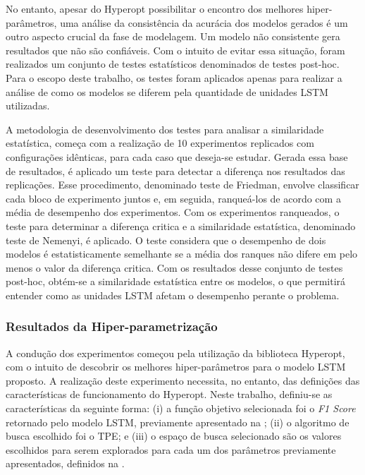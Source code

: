 No entanto, apesar do Hyperopt possibilitar o encontro dos melhores hiper-parâmetros, uma análise da consistência da acurácia dos modelos gerados é um outro aspecto crucial da fase de modelagem. Um modelo não consistente gera resultados que não são confiáveis. Com o intuito de evitar essa situação, foram realizados um conjunto de testes estatísticos denominados de testes post-hoc. Para o escopo deste trabalho, os testes foram aplicados apenas para realizar a análise de como os modelos se diferem pela quantidade de unidades \acrshort{LSTM} utilizadas.

A metodologia de desenvolvimento dos testes para analisar a similaridade estatística, começa com a realização de 10 experimentos replicados com configurações idênticas, para cada caso que deseja-se estudar. Gerada essa base de resultados, é aplicado um teste para detectar a diferença nos resultados das replicações. Esse procedimento, denominado teste de Friedman, envolve classificar cada bloco de experimento juntos e, em seguida, ranqueá-los de acordo com a média de desempenho dos experimentos. Com os experimentos ranqueados, o teste para determinar a diferença critica e a similaridade estatística, denominado teste de Nemenyi, é aplicado. O teste considera que o desempenho de dois modelos é estatisticamente semelhante se a média dos ranques não difere em pelo menos o valor da diferença critica. Com os resultados desse conjunto de testes post-hoc, obtém-se a similaridade estatística entre os modelos, o que permitirá entender como as unidades \acrshort{LSTM} afetam o desempenho perante o problema.

\subsubsection{Resultados da Hiper-parametrização}

A condução dos experimentos começou pela utilização da biblioteca Hyperopt, com o intuito de descobrir os melhores hiper-parâmetros para o modelo \acrshort{LSTM} proposto. A realização deste experimento necessita, no entanto, das definições das características de funcionamento do Hyperopt. Neste trabalho, definiu-se as características da seguinte forma: (i) a função objetivo selecionada foi o \textit{F1 Score} retornado pelo modelo \acrshort{LSTM}, previamente apresentado na ; (ii) o algoritmo de busca escolhido foi o \acrshort{TPE}; e (iii) o espaço de busca selecionado são os valores escolhidos para serem explorados para cada um dos parâmetros previamente apresentados, definidos na . 

